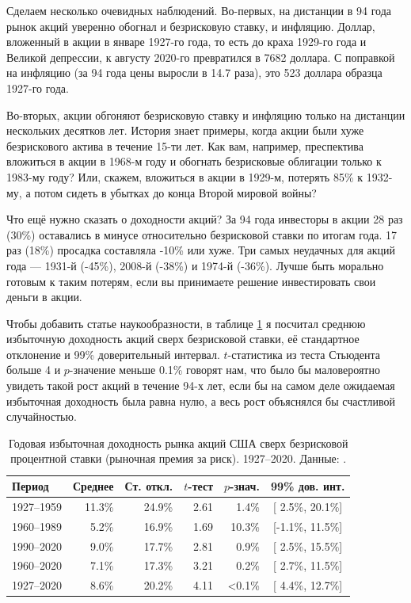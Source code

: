 Сделаем несколько очевидных наблюдений. Во-первых, на дистанции в 94 года рынок 
акций уверенно обогнал и безрисковую ставку, и инфляцию. Доллар, вложенный в 
акции в январе 1927-го года, то есть до краха 1929-го года и Великой депрессии, 
к августу 2020-го превратился в \num{7682} доллара. С поправкой на инфляцию (за 
94 года цены выросли в 14.7 раза), это 523 доллара образца 1927-го года.

Во-вторых, акции обгоняют безрисковую ставку и инфляцию только на дистанции 
нескольких десятков лет. История знает примеры, когда акции были хуже 
безрискового актива в течение 15-ти лет. Как вам, например, преспектива 
вложиться в акции в 1968-м году и обогнать безрисковые облигации только к
1983-му году? Или, скажем, вложиться в акции в 1929-м, потерять 85\% к 1932-му, 
а потом сидеть в убытках до конца Второй мировой войны?

Что ещё нужно сказать о доходности акций? За 94 года инвесторы в акции 28 раз 
(30\%) оставались в минусе относительно безрисковой ставки по итогам года. 17 
раз (18\%) просадка составляла -10\% или хуже. Три самых неудачных для акций 
года --- 1931\nobreakdash-й (-45\%), 2008\nobreakdash-й (-38\%) и 
1974\nobreakdash-й (-36\%). Лучше быть морально готовым к таким потерям, если вы 
принимаете решение инвестировать свои деньги в акции.

Чтобы добавить статье наукообразности, в таблице \ref{us_market_risk_premium} я 
посчитал среднюю избыточную доходность акций сверх безрисковой ставки, её 
стандартное отклонение и 99\% доверительный интервал. $t$-статистика из теста 
Стьюдента больше 4 и $p$-значение меньше 0.1\% говорят нам, что было бы 
маловероятно увидеть такой рост акций в течение 94-х лет, если бы на самом деле 
ожидаемая избыточная доходность была равна нулю, а весь рост объяснялся бы 
счастливой случайностью.

\begin{table}[h]
\centering
\begin{tabular}{l|r|r|r|r|c}
Период & Среднее & Ст. откл. & $t$-тест & $p$-знач. & 99\% дов. инт. \\
\hline
1927--1959 & 11.3\% & 24.9\% & 2.61 &  1.4\% & [ 2.5\%, 20.1\%] \\ 
1960--1989 &  5.2\% & 16.9\% & 1.69 & 10.3\% & [-1.1\%, 11.5\%] \\
1990--2020 &  9.0\% & 17.7\% & 2.81 &  0.9\% & [ 2.5\%, 15.5\%] \\
1960--2020 &  7.1\% & 17.3\% & 3.21 &  0.2\% & [ 2.7\%, 11.5\%] \\ \hline
1927--2020 &  8.6\% & 20.2\% & 4.11 & <0.1\% & [ 4.4\%, 12.7\%] 
\end{tabular}
\caption{Годовая избыточная доходность рынка акций США сверх безрисковой 
процентной ставки (рыночная премия за риск). 1927--2020. Данные: 
\cite{kennethFrench}.}
\label{us_market_risk_premium}
\end{table}

